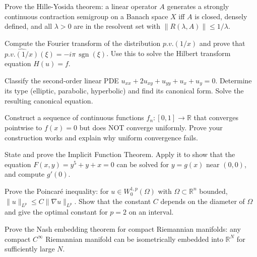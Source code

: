 \documentclass[12pt,a4paper]{exam}
\begin{document}
\begin{questions}

\question[2]
Prove the Hille-Yosida theorem: a linear operator $A$ generates a strongly continuous contraction semigroup on a Banach space $X$ iff $A$ is closed, densely defined, and all $\lambda > 0$ are in the resolvent set with $\|R(\lambda,A)\| \leq 1/\lambda$.

\vspace{0.3cm}

\question[4]
Compute the Fourier transform of the distribution $p.v.(1/x)$ and prove that $\widehat{p.v.(1/x)}(\xi) = -i\pi \, \operatorname{sgn}(\xi)$. Use this to solve the Hilbert transform equation $H(u) = f$.

\vspace{0.3cm}

\question[5]
Classify the second-order linear PDE $u_{xx} + 2u_{xy} + u_{yy} + u_x + u_y = 0$. Determine its type (elliptic, parabolic, hyperbolic) and find its canonical form. Solve the resulting canonical equation.

\vspace{0.3cm}

\question[2]
Construct a sequence of continuous functions $f_n: [0,1] \to \mathbb{R}$ that converges pointwise to $f(x) = 0$ but does NOT converge uniformly. Prove your construction works and explain why uniform convergence fails.

\vspace{0.3cm}

\question[5]
State and prove the Implicit Function Theorem. Apply it to show that the equation $F(x,y) = y^5 + y + x = 0$ can be solved for $y = g(x)$ near $(0,0)$, and compute $g'(0)$.

\vspace{0.3cm}

\question[5]
Prove the Poincar\'e inequality: for $u \in W_0^{1,p}(\Omega)$ with $\Omega \subset \mathbb{R}^n$ bounded, $\|u\|_{L^p} \leq C \|\nabla u\|_{L^p}$. Show that the constant $C$ depends on the diameter of $\Omega$ and give the optimal constant for $p=2$ on an interval.

\vspace{0.3cm}

\question[2]
Prove the Nash embedding theorem for compact Riemannian manifolds: any compact $C^\infty$ Riemannian manifold can be isometrically embedded into $\mathbb{R}^N$ for sufficiently large $N$.

\vspace{0.3cm}


\end{questions}
\end{document}
